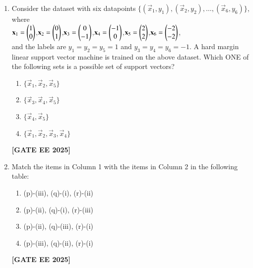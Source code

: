 \documentclass[journal]{IEEEtran}
\newcommand{\qfooter}{%
  \begin{flushright}\footnotesize\textbf{[GATE EE 2025]}\end{flushright}\vspace{1em}%
}
\begin{document}
\begin{enumerate}[leftmargin=*,label=\arabic*.]
\item Consider the dataset with six datapoints $\{(\vec{x}_1, y_1), (\vec{x}_2, y_2), \ldots, (\vec{x}_6, y_6)\}$, where\\
$\mathbf{x}_1 = \begin{pmatrix}1\\0\end{pmatrix}$,\quad $\mathbf{x}_2 = \begin{pmatrix}0\\1\end{pmatrix}$,\quad $\mathbf{x}_3 = \begin{pmatrix}0\\-1\end{pmatrix}$,\quad $\mathbf{x}_4 = \begin{pmatrix}-1\\0\end{pmatrix}$,\quad $\mathbf{x}_5 = \begin{pmatrix}2\\2\end{pmatrix}$,\quad $\mathbf{x}_6 = \begin{pmatrix}-2\\-2\end{pmatrix}$,\\
and the labels are $y_1 = y_2 = y_5 = 1$ and $y_3 = y_4 = y_6 = -1$. A hard margin linear support vector machine is trained on the above dataset. Which ONE of the following sets is a possible set of support vectors?
\begin{multicols}{2}
\begin{enumerate}[label=(\Alph*)]
\item $\{\vec{x}_1, \vec{x}_2, \vec{x}_5\}$
\item $\{\vec{x}_3, \vec{x}_4, \vec{x}_5\}$
\item $\{\vec{x}_4, \vec{x}_5\}$
\item $\{\vec{x}_1, \vec{x}_2, \vec{x}_3, \vec{x}_4\}$
\end{enumerate} \qfooter
\end{multicols}

\item Match the items in Column 1 with the items in Column 2 in the following table:

\begin{multicols}{2}
\begin{enumerate}[label=(\Alph*)]
\item (p)-(iii), (q)-(i), (r)-(ii)
\item (p)-(ii), (q)-(i), (r)-(iii)
\item (p)-(ii), (q)-(iii), (r)-(i)
\item (p)-(iii), (q)-(ii), (r)-(i)
\end{enumerate}
\qfooter
\end{multicols}


\end{enumerate}
\end{document}
